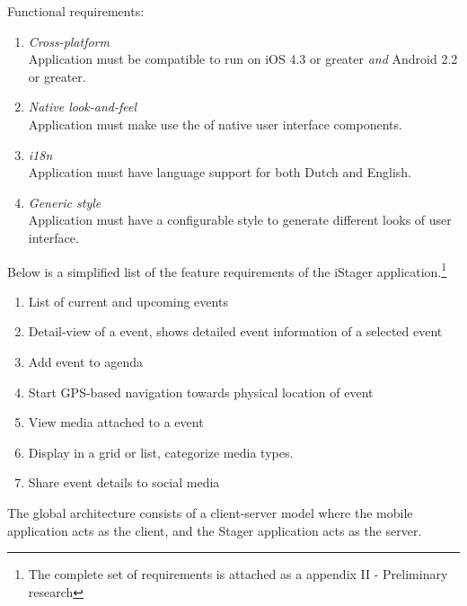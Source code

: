 Functional requirements:
\begin{enumerate}
\item \emph{Cross-platform}\\Application must be compatible to run on iOS 4.3 or greater \emph{and} Android 2.2 or greater.
\item \emph{Native look-and-feel}\\Application must make use the of native user interface components.
\item \emph{i18n}\\Application must have language support for both Dutch and English.
\item \emph{Generic style}\\Application must have a configurable style to generate different looks of user interface.
\end{enumerate}

\noindent Below is a simplified list of the feature requirements of the iStager application.\footnote{The complete set of requirements is attached as a appendix II - Preliminary research}
\begin{enumerate}
\item
List of current and upcoming events
\item
Detail-view of a event, shows detailed event information of a selected event
\item
Add event to agenda
\item
Start GPS-based navigation towards physical location of event
\item
View media attached to a event
\item
Display in a grid or list, categorize media types.
\item
Share event details to social media
\end{enumerate}

The global architecture consists of a client-server model where the mobile application acts as the client, and the Stager application acts as the server.

